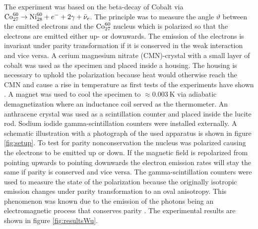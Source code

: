 The experiment was based on the beta-decay of Cobalt via $\text{Co}^{60}_{27}\rightarrow \text{Ni}^{60}_{28}+e^-+2\gamma+\bar\nu_e$.
The principle was to measure the angle $\vartheta$ between the emitted electrons and the $\text{Co}^{60}_{27}$ nucleus which is polarized so that the electrons are emitted either up- or downwards.
The emission of the electrons is invariant under parity transformation if it is conserved in the weak interaction and vice versa.
A cerium magnesium nitrate (CMN)-crystal with a small layer of cobalt was used as the specimen and placed inside a housing.
The housing is necessary to uphold the polarization because heat would otherwise reach the CMN and cause a rise in temperature as first tests of the experiments have shown \cite{CaseStudies}.
A magnet was used to cool the specimen to $\approx \SI{0.003}{\kelvin}$ via adiabatic demagnetization where an inductance coil served as the thermometer.
An anthracene crystal was used as a scintillation counter and placed inside the lucite rod.
Sodium iodide gamma-scintillation counters were installed externally.
A schematic illustration with a photograph of the used apparatus is shown in figure \ref{fig:setup}.
To test for parity nonconservation the nucleus was polarized causing the electrons to be emitted up or down.
If the magnetic field is repolarized from pointing upwards to pointing downwards the electron emission rates will stay the same if parity is conserved and vice versa.
The gamma-scintillation counters were used to measure the state of the polarization because the originally isotropic emission changes under parity transformation to an oval anisotropy.
This phenomenon was known due to the emission of the photons being an electromagnetic process that conserves parity \cite{CaseStudies}.
The experimental results are shown in figure \ref{fig:resultsWu}.
